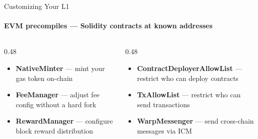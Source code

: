 \documentclass[aspectratio=169]{beamer}
\begin{document}
\begin{frame}{Customizing Your L1}
	\framesubtitle{EVM precompiles — Solidity contracts at known addresses}

	\begin{columns}[t]
		\begin{column}{0.48\textwidth}
			\begin{itemize}
				\item \textbf{NativeMinter} — mint your gas token on-chain
				\item \textbf{FeeManager} — adjust fee config without a hard fork
				\item \textbf{RewardManager} — configure block reward distribution
			\end{itemize}
		\end{column}
		\begin{column}{0.48\textwidth}
			\begin{itemize}
				\item \textbf{ContractDeployerAllowList} — restrict who can deploy contracts
				\item \textbf{TxAllowList} — restrict who can send transactions
				\item \textbf{WarpMessenger} — send cross-chain messages via ICM
			\end{itemize}
		\end{column}
	\end{columns}

	\vspace{0.25em}
\end{frame}
\end{document}

